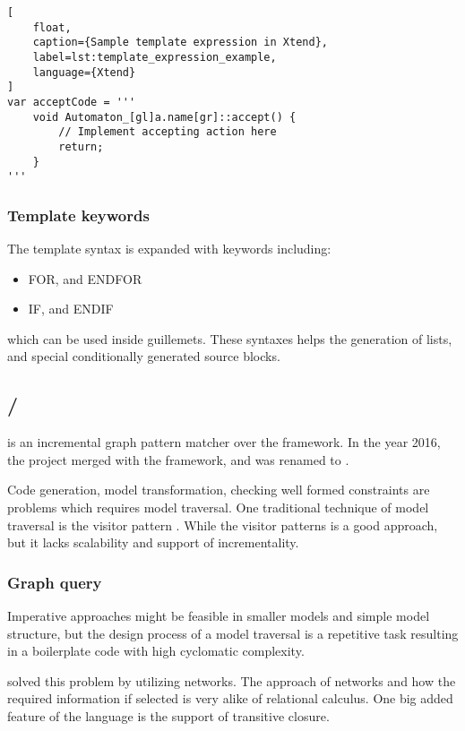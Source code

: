 \begin{lstlisting}[
	float,
	caption={Sample template expression in Xtend},
	label=lst:template_expression_example,
	language={Xtend}
]
var acceptCode = '''
	void Automaton_[gl]a.name[gr]::accept() {
		// Implement accepting action here
		return;
	}
'''
\end{lstlisting}

\subsubsection{Template keywords}

The template syntax is expanded with keywords including:
\begin{itemize}
	\item FOR, and ENDFOR
	\item IF, and ENDIF
\end{itemize}
which can be used inside guillemets. These syntaxes helps the generation of lists, and special conditionally generated source blocks.

\subsection{\viatraq/\incq}

\viatraq{} \citep{ujhelyi2015emf} is an incremental graph pattern matcher over the \emf{} framework. In the year 2016, the project merged with the \viatra{} framework, and \incq{} was renamed to \viatraq.

Code generation, model transformation, checking well formed constraints are problems which requires model traversal. One traditional technique of model traversal is the visitor pattern \citep{gamma1995design}. While the visitor patterns is a good approach, but it lacks scalability and support of incrementality.

\subsubsection{Graph query}

Imperative approaches might be feasible in smaller models and simple model structure, but the design process of a model traversal is a repetitive task resulting in a boilerplate code with high cyclomatic complexity.

\viatraq{} solved this problem by utilizing \rete{} networks. The approach of \rete{} networks and how the required information if selected is very alike of relational calculus. One big added feature of the language is the support of transitive closure.

